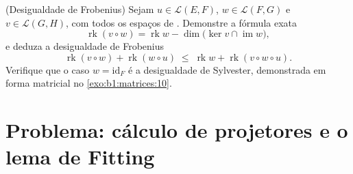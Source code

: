 \begin{exercise}[$\star\star\star$]\label{exo:b1:linmaps:12}
(Desigualdade de Frobenius) Sejam $u \in \mathcal{L}(E, F)$, $w \in
\mathcal{L}(F, G)$ e $v \in \mathcal{L}(G, H)$, com todos
os espaços de . Demonstre a fórmula exata
\[
\operatorname{rk}(v \circ w) = \operatorname{rk} w -
\dim\bigl(\ker v \cap \operatorname{im} w\bigr),
\]
e deduza a desigualdade de Frobenius
\[
\operatorname{rk}(v \circ w) + \operatorname{rk}(w \circ u)
\;\leq\; \operatorname{rk} w + \operatorname{rk}(v \circ w \circ
u) .
\]
Verifique que o caso $w = \mathrm{id}_F$ é a desigualdade de Sylvester,
demonstrada em forma matricial no \cref{exo:b1:matrices:10}.
\end{exercise}

\section{Problema: cálculo de projetores e o lema de Fitting}

